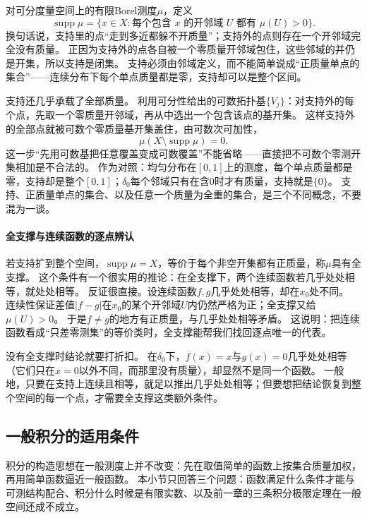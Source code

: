 对可分度量空间上的有限Borel测度$\mu$，定义
\[
 \operatorname{supp}\mu
  =\{x\in X:\text{每个包含 }x\text{ 的开邻域 }U\text{ 都有 }\mu(U)>0\}.
\]
换句话说，支持里的点“走到多近都躲不开质量”；支持外的点则存在一个开邻域完全没有质量。
正因为支持外的点各自被一个零质量开邻域包住，这些邻域的并仍是开集，所以支持是闭集。
支持必须由邻域定义，而不能简单说成“正质量单点的集合”——连续分布下每个单点质量都是零，支持却可以是整个区间。

支持还几乎承载了全部质量。
利用可分性给出的可数拓扑基$\{V_j\}$：对支持外的每个点，先取一个零质量开邻域，再从中选出一个包含该点的基开集。
这样支持外的全部点就被可数个零质量基开集盖住，由可数次可加性，
\[
 \mu(X\setminus\operatorname{supp}\mu)=0.
\]
这一步“先用可数基把任意覆盖变成可数覆盖”不能省略——直接把不可数个零测开集相加是不合法的。
作为对照：均匀分布在$[0,1]$上的测度，每个单点质量都是零，支持却是整个$[0,1]$；$\delta_0$每个邻域只有在含$0$时才有质量，支持就是$\{0\}$。
支持、正质量单点的集合、以及任意一个质量为全重的集合，是三个不同概念，不要混为一谈。

\paragraph{全支撑与连续函数的逐点辨认}

若支持扩到整个空间，$\operatorname{supp}\mu=X$，等价于每个非空开集都有正质量，称$\mu$具有全支撑。
这个条件有一个很实用的推论：在全支撑下，两个连续函数若几乎处处相等，就处处相等。
反证很直接。设连续函数$f,g$几乎处处相等，却在$x_0$处不同。
连续性保证差值$|f-g|$在$x_0$的某个开邻域$U$内仍然严格为正；全支撑又给$\mu(U)>0$。
于是$f\neq g$的地方有正质量，与几乎处处相等矛盾。
这说明：把连续函数看成“只差零测集”的等价类时，全支撑能帮我们找回逐点唯一的代表。

没有全支撑时结论就要打折扣。
在$\delta_0$下，$f(x)=x$与$g(x)=0$几乎处处相等（它们只在$x=0$以外不同，而那里没有质量），却显然不是同一个函数。
一般地，只要在支持上连续且相等，就足以推出几乎处处相等；但要想把结论恢复到整个空间的每一个点，才需要全支撑这类额外条件。

\subsection{一般积分的适用条件}

积分的构造思想在一般测度上并不改变：先在取值简单的函数上按集合质量加权，再用简单函数逼近一般函数。
本小节只回答三个问题：函数满足什么条件才能与可测结构配合、积分什么时候是有限实数、以及前一章的三条积分极限定理在一般空间还成不成立。

